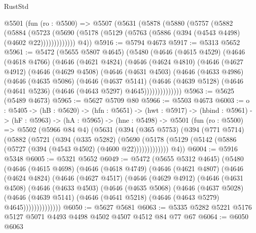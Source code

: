 \begin{lexlean}{RustStd}
\begin{coremodule}
{\begin{coremodule}
{{{{{{{{  @5501
    (fun (ro : @5500) =>
    @5507
      (@5631
        (@5878
          (@5880
            (@5757
              (@5882
                (@5884
                  (@5723
                    (@5690 (@5178 (@5129 (@5763 (@5886 (@394 (@4543 @4498) (@4602 @22)))))))))))))
        @4))
@5916 := @5794 @4673
@5917 := @5313 @5652
@5961 := @5472
    (@5655 @5807 @4645)
    (@5480
      (@4646
        (@4615 @4529)
        (@4646
          (@4618 @4766)
          (@4646
            (@4621 @4824)
            (@4646
              (@4624 @4810)
              (@4646
                (@4627 @4912)
                (@4646
                  (@4629 @4508)
                  (@4646
                    (@4631 @4503)
                    (@4646
                      (@4633 @4986)
                      (@4646
                        (@4635 @5086)
                        (@4646
                          (@4637 @5141)
                          (@4646
                            (@4639 @5128)
                            (@4646 (@4641 @5236) (@4646 (@4643 @5297) @4645))))))))))))))
@5963 := @5625 (@5489 @4673)
@5965 := @5627 @5709 @80
@5966 := @5503 @4673
@6003 := {o : @5405} ->
  (hB : @5620) ->
  (hfn : @5651) ->
  (hwt : @5917) ->
  (hbind : @5961) ->
  (hF : @5963) ->
  (hA : @5965) ->
  (hne : @5498) ->
  @5501
    (fun (ro : @5500) =>
    @5502
      (@5966 @84 @4)
      (@5631
        (@394
          (@365 @5753)
          (@394
            (@771 @5714)
            (@5882
              (@5721
                (@394
                  (@335 @5282)
                  (@5690
                    (@5178 (@5129 (@5142 (@5886 (@5727 (@394 (@4543 @4502) (@4600 @22)))))))))))))
        @4))
@6004 := @5916 @5348
@6005 := @5321 @5652
@6049 := @5472
    (@5655 @5312 @4645)
    (@5480
      (@4646
        (@4615 @4698)
        (@4646
          (@4618 @4749)
          (@4646
            (@4621 @4807)
            (@4646
              (@4624 @4824)
              (@4646
                (@4627 @4517)
                (@4646
                  (@4629 @4912)
                  (@4646
                    (@4631 @4508)
                    (@4646
                      (@4633 @4503)
                      (@4646
                        (@4635 @5068)
                        (@4646
                          (@4637 @5028)
                          (@4646
                            (@4639 @5141)
                            (@4646 (@4641 @5218) (@4646 (@4643 @5279) @4645))))))))))))))
@6050 := @5627 @5681
@6063 := @5335 @5282 @5221 @5176 @5127 @5071 @4493 @4498 @4502 @4507 @4512 @84 @77 @67
@6064 := @6050 @6063
}}}}}}}}
\end{coremodule}}
\end{coremodule}
\end{lexlean}
